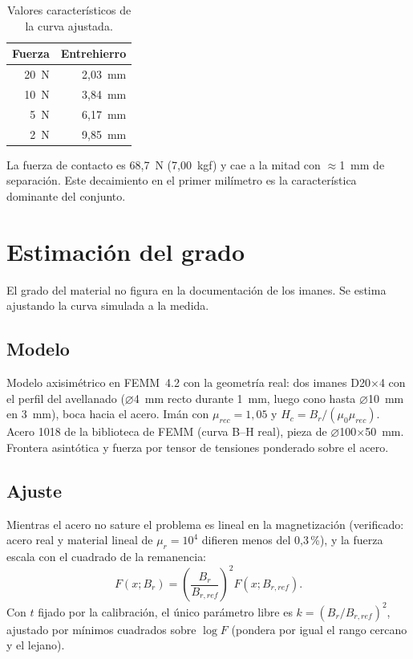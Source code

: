 \documentclass[11pt,a4paper]{article}
\begin{document}
\begin{table}[H]\centering\small
\caption{Valores característicos de la curva ajustada.}
\label{tab:caract}
\begin{tabular}{r r}
\toprule
Fuerza & Entrehierro\\\midrule
20~N & 2,03~mm\\
10~N & 3,84~mm\\
5~N  & 6,17~mm\\
2~N  & 9,85~mm\\
\bottomrule
\end{tabular}
\end{table}

La fuerza de contacto es 68,7~N (7,00~kgf) y cae a la mitad con $\approx$1~mm de separación. Este
decaimiento en el primer milímetro es la característica dominante del conjunto.

\section{Estimación del grado}
\label{sec:grado}
El grado del material no figura en la documentación de los imanes. Se estima ajustando la curva
simulada a la medida.

\subsection{Modelo}
Modelo axisimétrico en FEMM~4.2 con la geometría real: dos imanes D20$\times$4 con el perfil del
avellanado ($\varnothing$4~mm recto durante 1~mm, luego cono hasta $\varnothing$10~mm en 3~mm), boca hacia
el acero. Imán con $\mu_{rec}=1{,}05$ y $H_c=B_r/(\mu_0\mu_{rec})$. Acero 1018 de la biblioteca de FEMM
(curva B--H real), pieza de $\varnothing$100$\times$50~mm. Frontera asintótica y fuerza por tensor de
tensiones ponderado sobre el acero.

\subsection{Ajuste}
Mientras el acero no sature el problema es lineal en la magnetización (verificado: acero real y
material lineal de $\mu_r=10^4$ difieren menos del 0,3\,\%), y la fuerza escala con el cuadrado de la
remanencia:
\begin{equation}
F(x;B_r)=\left(\frac{B_r}{B_{r,ref}}\right)^{2}F(x;B_{r,ref}) .
\label{eq:br2}
\end{equation}
Con $t$ fijado por la calibración, el único parámetro libre es $k=(B_r/B_{r,ref})^2$, ajustado por
mínimos cuadrados sobre $\log F$ (pondera por igual el rango cercano y el lejano).
\end{document}
